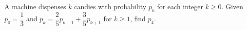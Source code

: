 A machine dispenses $k$ candies with probability $p_k$ for each integer $k\ge0$. Given $p_0=\dfrac{1}{3}$ and $p_k=\dfrac{2}{5}p_{k-1}+\dfrac{3}{5}p_{k+1}$ for $k\ge1$, find $p_4$.
